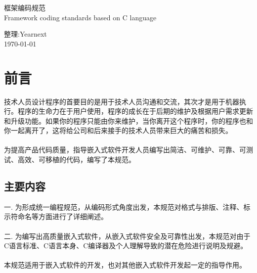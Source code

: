 \documentclass[UTF8,a4paper,12pt]{article}
\begin{document}
	\begin{center}
		\large 框架编码规范\\
		\large Framework coding standards based on C language
		\newline
		\newline
		\newline
		\newline
		\newline
		\newline
		\newline
		\newline
		\newline
		\newline
		\newline
		\newline
		\newline
		\newline
		\newline
		\newline
		\newline
		\newline
		\newline
	\end{center}

	\begin{center}
		\large 整理:Yearnext 
		\\
		\large \today
	\end{center}
	\newpage
	
	\tableofcontents
	\newpage
	
	\section{前言}
	技术人员设计程序的首要目的是用于技术人员沟通和交流，其次才是用于机器执行。程序的生命力在于用户使用，程序的成长在于后期的维护及根据用户需求更新和升级功能。如果你的程序只能由你来维护，当你离开这个程序时，你的程序也和你一起离开了，这将给公司和后来接手的技术人员带来巨大的痛苦和损失。\\
	\\
	为提高产品代码质量，指导嵌入式软件开发人员编写出简洁、可维护、可靠、可测试、高效、可移植的代码，编写了本规范。\\

	\subsection{主要内容}
	一. 为形成统一编程规范，从编码形式角度出发，本规范对格式与排版、注释、标示符命名等方面进行了详细阐述。\\
	\\
	二. 为编写出高质量嵌入式软件，从嵌入式软件安全及可靠性出发，本规范对由于C语言标准、C语言本身、C编译器及个人理解导致的潜在危险进行说明及规避。\\
	\\
	本规范适用于嵌入式软件的开发，也对其他嵌入式软件开发起一定的指导作用。\\
	
\end{document}
